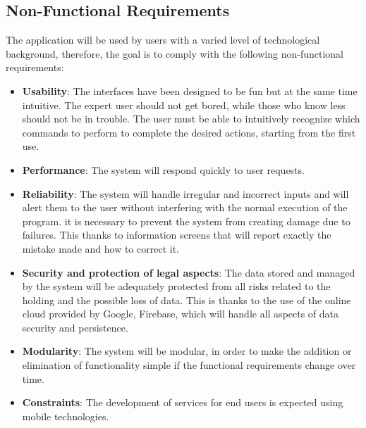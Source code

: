 \subsection{Non-Functional Requirements}
The application will be used by users with a varied level of technological background, therefore, the goal is to comply with the following non-functional requirements:
\begin{itemize}
	\item \textbf{Usability}:
	The interfaces have been designed to be fun but at the same time intuitive. The expert user should not get bored, while those who know less should not be in trouble. The user must be able to intuitively recognize which commands to perform to complete the desired actions, starting from the first use.
	\item \textbf{Performance}:
	The system will respond quickly to user requests.
	\item \textbf {Reliability}:
	The system will handle irregular and incorrect inputs and will alert them to the user without interfering with the normal execution of the program. it is necessary to prevent the system from creating damage due to failures. This thanks to information screens that will report exactly the mistake made
	and how to correct it.
	\item \textbf{Security and protection of legal aspects}:
	The data stored and managed by the system will be adequately protected from all risks related to the holding and the possible loss of data. This is thanks to the use of the online cloud provided by Google, Firebase, which will handle all aspects of data security and persistence.
	\item \textbf{Modularity}:
	The system will be modular, in order to make the addition or elimination of functionality simple if the functional requirements change over time.
	\item \textbf{Constraints}:
	The development of services for end users is expected using mobile technologies.
\end{itemize}